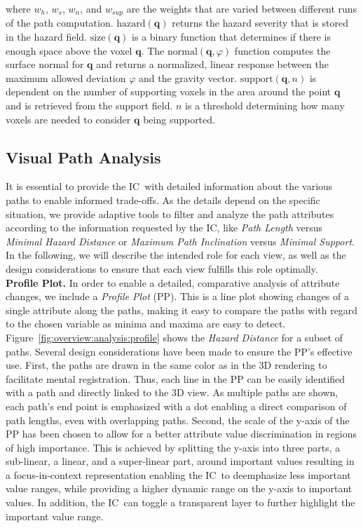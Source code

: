 \documentclass[conference,10pt,letter]{IEEEtran}
\def\IC{IC}
\begin{document}
\noindent where $w_h$, $w_s$, $w_n$, and $w_{sup}$ are the weights that are varied between different runs of the path computation. $\textrm{hazard}(\mathbf{q})$ returns the hazard severity that is stored in the hazard field. $\textrm{size}(\mathbf{q})$ is a binary function that determines if there is enough space above the voxel $\mathbf{q}$. The $\textrm{normal}(\mathbf{q},\varphi)$ function computes the surface normal for $\mathbf{q}$ and returns a normalized, linear response between the maximum allowed deviation $\varphi$ and the gravity vector. $\mathrm{support}(\mathbf{q},n)$ is dependent on the number of supporting voxels in the area around the point $\mathbf{q}$ and is retrieved from the support field. $n$ is a threshold determining how many voxels are needed to consider $\mathbf{q}$ being supported.

\subsection{Visual Path Analysis} \label{sec:overview:pathanalysis}
It is essential to provide the \IC\ with detailed information about the various paths to enable informed trade-offs. As the details depend on the specific situation, we provide adaptive tools to filter and analyze the path attributes according to the information requested by the \IC , like \emph{Path Length} versus \emph{Minimal Hazard Distance} or \emph{Maximum Path Inclination} versus \emph{Minimal Support}. In the following, we will describe the intended role for each view, as well as the design considerations to ensure that each view fulfills this role optimally.\\
%
\noindent \textbf{Profile Plot.} In order to enable a detailed, comparative analysis of attribute changes, we include a \emph{Profile Plot} (PP). This is a line plot showing changes of a single attribute along the paths, making it easy to compare the paths with regard to the chosen variable as minima and maxima are easy to detect. Figure~\ref{fig:overview:analysis:profile} shows the \emph{Hazard Distance} for a subset of paths. Several design considerations have been made to ensure the PP's effective use. First, the paths are drawn in the same color as in the 3D rendering to facilitate mental registration. Thus, each line in the PP can be easily identified with a path and directly linked to the 3D view. As multiple paths are shown, each path's end point is emphasized with a dot enabling a direct comparison of path lengths, even with overlapping paths. Second, the scale of the y-axis of the PP has been chosen to allow for a better attribute value discrimination in regions of high importance. This is achieved by splitting the y-axis into three parts, a sub-linear, a linear, and a super-linear part, around important values resulting in a focus-in-context representation enabling the \IC\ to deemphasize less important value ranges, while providing a higher dynamic range on the y-axis to important values. In addition, the \IC\ can toggle a transparent layer to further highlight the important value range. \\
\end{document}
